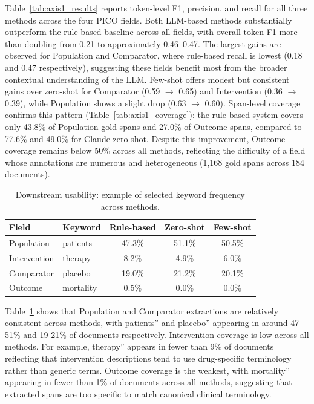 \documentclass{article}
\begin{document}
Table~\ref{tab:axis1_results} reports token-level F1, precision, and recall for all three methods across the four PICO fields. Both LLM-based methods substantially outperform the rule-based baseline across all fields, with overall token F1 more than doubling from 0.21 to approximately 0.46--0.47. The largest gains are observed for Population and Comparator, where rule-based recall is lowest (0.18 and 0.47 respectively), suggesting these fields benefit most from the broader contextual understanding of the LLM. Few-shot offers modest but consistent gains over zero-shot for Comparator (0.59 $\rightarrow$ 0.65) and Intervention (0.36 $\rightarrow$ 0.39), while Population shows a slight drop (0.63 $\rightarrow$ 0.60). Span-level coverage confirms this pattern (Table~\ref{tab:axis1_coverage}): the rule-based system covers only 43.8\% of Population gold spans and 27.0\% of Outcome spans, compared to 77.6\% and 49.0\% for Claude zero-shot. Despite this improvement, Outcome coverage remains below 50\% across all methods, reflecting the difficulty of a field whose annotations are numerous and heterogeneous (1,168 gold spans across 184 documents).

\begin{table}[h]
\centering
\caption{Downstream usability: example of selected keyword frequency across methods.}
\label{tab:usability}
\begin{tabular}{llccc}
\toprule
\textbf{Field} & \textbf{Keyword} & \textbf{Rule-based} & \textbf{Zero-shot} & \textbf{Few-shot} \\
\midrule
Population   & patients        & 47.3\% & 51.1\% & 50.5\% \\
Intervention & therapy         & 8.2\%  & 4.9\%  & 6.0\%  \\
Comparator   & placebo         & 19.0\% & 21.2\% & 20.1\% \\
Outcome      & mortality       & 0.5\%  & 0.0\%  & 0.0\%  \\
\bottomrule
\end{tabular}
\end{table}

Table~\ref{tab:usability} shows that Population and Comparator extractions are relatively consistent across methods, with patients'' and placebo'' appearing in around 47-51\% and 19-21\% of documents respectively. Intervention coverage is low across all methods. For example, therapy'' appears in fewer than 9\% of documents reflecting that intervention descriptions tend to use drug-specific terminology rather than generic terms. Outcome coverage is the weakest, with mortality'' appearing in fewer than 1\% of documents across all methods, suggesting that extracted spans are too specific to match canonical clinical terminology.
\end{document}

